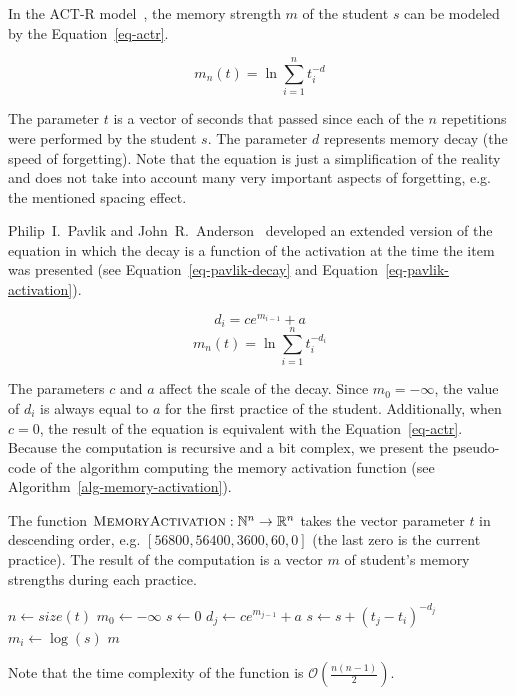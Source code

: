 In the ACT-R model~\cite{Pavlik2003}, the memory strength $m$ of the student $s$ can be modeled by the Equation~\ref{eq-actr}.

\begin{equation} \label{eq-actr}
  m_n(t) = \ln{\sum_{i=1}^{n} t_{i}^{-d}}
\end{equation}

The parameter $t$ is a vector of seconds that passed since each of the $n$ repetitions were performed by the student $s$. The parameter $d$ represents memory decay (the speed of forgetting). Note that the equation is just a simplification of the reality and does not take into account many very important aspects of forgetting, e.g. the mentioned spacing effect.

Philip~I.~Pavlik and John~R.~Anderson~\cite{Pavlik2005} developed an extended version of the equation in which the decay is a function of the activation at the time the item was presented (see Equation~\ref{eq-pavlik-decay} and Equation~\ref{eq-pavlik-activation}).

\begin{equation} \label{eq-pavlik-decay}
  d_i = ce^{m_{i-1}} + a
\end{equation}
\begin{equation} \label{eq-pavlik-activation}
  m_n(t) = \ln{\sum_{i=1}^{n} t_{i}^{-d_i}}
\end{equation}

The parameters $c$ and $a$ affect the scale of the decay. Since $m_0 = -\infty$, the value of $d_i$ is always equal to $a$ for the first practice of the student. Additionally, when $c = 0$, the result of the equation is equivalent with the Equation~\ref{eq-actr}. Because the computation is recursive and a bit complex, we present the pseudo-code of the algorithm computing the memory activation function (see Algorithm~\ref{alg-memory-activation}).

\begin{algorithm}
  \caption{The function $\textsc{MemoryActivation}: \mathbb{N}^n \rightarrow \mathbb{R}^n$ takes the vector parameter $t$ in descending order, e.g. $[56800, 56400, 3600, 60, 0]$ (the last zero is the current practice). The result of the computation is a vector $m$ of student's memory strengths during each practice.}
  \label{alg-memory-activation}
  \begin{algorithmic}[1]
      \State $n \gets size(t)$
      \State $m_0 \gets -\infty$
        \State $s \gets 0$
          \State $d_j \gets ce^{m_{j-1}} + a$
          \State $s \gets s + (t_j - t_i)^{-d_j}$
        \EndFor
        \State $m_i \gets \log(s)$
      \EndFor
      \State \Return $m$
    \EndFunction
  \end{algorithmic}
\end{algorithm}

Note that the time complexity of the function is $\mathcal{O}\left(\frac{n(n-1)}{2}\right)$.
